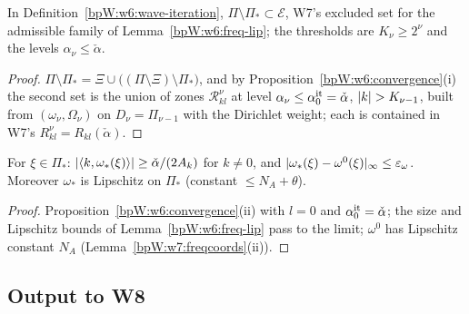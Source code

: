 \begin{lemma}[Exclusion]\label{bpW:w6:exclusion}
In Definition~\ref{bpW:w6:wave-iteration}, $\Pi\setminus\Pi_*\subset\mathcal E$, W7's excluded set for the admissible family of
Lemma~\ref{bpW:w6:freq-lip}; the thresholds are $K_\nu\ge2^\nu$ and the levels $\alpha_\nu\le\check\alpha$.
\end{lemma}
\begin{proof}
$\Pi\setminus\Pi_*=\Xi\cup\bigl((\Pi\setminus\Xi)\setminus\Pi_*\bigr)$, and by Proposition~\ref{bpW:w6:convergence}(i) the second set is the union
of zones $\mathcal R^\nu_{kl}$ at level $\alpha_\nu\le\alpha_0^{\rm it}=\check\alpha$, $\lvert k\rvert>K_{\nu-1}$, built from $(\omega_\nu,\Omega_\nu)$ on
$D_\nu=\Pi_{\nu-1}$ with the Dirichlet weight; each is contained in W7's $R^\nu_{kl}=R_{kl}(\check\alpha)$.
\end{proof}

\begin{lemma}\label{bpW:w6:final-freq}
For $\xi\in\Pi_*$: $\lvert \langle k,\omega_*(\xi)\rangle\rvert\ge\check\alpha/(2A_k)$ for $k\ne0$, and $\lvert \omega_*(\xi)-\omega^0(\xi)\rvert_\infty\le\varepsilon_\omega$.
Moreover $\omega_*$ is Lipschitz on $\Pi_*$ (constant $\le N_A+\theta$).
\end{lemma}
\begin{proof}
Proposition~\ref{bpW:w6:convergence}(ii) with $l=0$ and $\alpha_0^{\rm it}=\check\alpha$; the size and Lipschitz bounds of
Lemma~\ref{bpW:w6:freq-lip} pass to the limit; $\omega^0$ has Lipschitz constant $N_A$ (Lemma~\ref{bpW:w7:freqcoords}(ii)).
\end{proof}

\subsection{Output to W8}\label{bpW:w6:out-sec}

